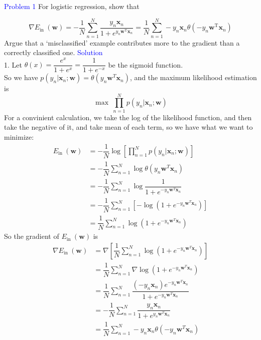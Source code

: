 \textcolor{blue}{Problem 1}
For logistic regression, show that

\begin{equation}
    \nabla E_{\text {in }}(\mathbf{w})  =-\frac{1}{N} \sum_{n=1}^{N} \frac{y_{n} \mathbf{x}_{n}}{1+e^{y_{n} \mathbf{w}^{\mathrm{T}} \mathbf{x}_{n}}}  
 =\frac{1}{N} \sum_{n=1}^{N}-y_{n} \mathbf{x}_{n} \theta\left(-y_{n} \mathbf{w}^{\mathrm{T}} \mathbf{x}_{n}\right)
\end{equation}
Argue that a `misclassified' example contributes more to the gradient than a correctly classified one.
\textcolor{blue}{Solution}\\
1. Let $\theta(x)=\dfrac{e^x}{1+e^x}=\dfrac{1}{1+e^{-x}}$ be the sigmoid function. \\
So we have $p(y_n|\mathbf{x}_n;\mathbf{w})=\theta(y_n\mathbf{w}^T\mathbf{x}_n)$, and the maximum likelihood estimation is
$$ \max\ \prod_{n=1}^{N}p(y_n|\mathbf{x}_n;\mathbf{w})$$
For a convinient calculation, we take the log of the likelihood function, and then take the negative of it, and take mean of each term, so we have what we want to minimize:
\begin{align*}
    E_{\text {in }}(\mathbf{w}) &= -\dfrac{1}{N}\log[\prod_{n=1}^{N}p(y_n|\mathbf{x}_n;\mathbf{w})] \\
    &= -\dfrac{1}{N}\sum_{n=1}^{N}\log \theta(y_n\mathbf{w}^T\mathbf{x}_n)\\
    &= -\dfrac{1}{N}\sum_{n=1}^{N}\log \dfrac{1}{1+e^{-y_n\mathbf{w}^T\mathbf{x}_n}}\\
    &= -\dfrac{1}{N}\sum_{n=1}^{N} [- \log (1+e^{-y_n\mathbf{w}^T\mathbf{x}_n})]\\
    &= \dfrac{1}{N}\sum_{n=1}^{N}\log (1+e^{-y_n\mathbf{w}^T\mathbf{x}_n})
\end{align*}
So the gradient of $E_{\text {in }}(\mathbf{w})$ is
\begin{align*}
    \nabla E_{\text {in }}(\mathbf{w}) &= \nabla\left[\dfrac{1}{N}\sum_{n=1}^{N}\log (1+e^{-y_n\mathbf{w}^T\mathbf{x}_n}) \right] \\
    &= \dfrac{1}{N}\sum_{n=1}^{N}\nabla \log (1+e^{-y_n\mathbf{w}^T\mathbf{x}_n})\\
    &= \dfrac{1}{N}\sum_{n=1}^{N}\dfrac{(-y_n\mathbf{x}_n) e^{-y_n\mathbf{w}^T\mathbf{x}_n}}{1+e^{-y_n\mathbf{w}^T\mathbf{x}_n}}\\
    &= -\dfrac{1}{N}\sum_{n=1}^{N}\dfrac{y_n\mathbf{x}_n}{1+e^{y_n\mathbf{w}^T\mathbf{x}_n}}\\
    &= \dfrac{1}{N}\sum_{n=1}^{N}-y_n\mathbf{x}_n\theta(-y_n\mathbf{w}^T\mathbf{x}_n)
\end{align*}

